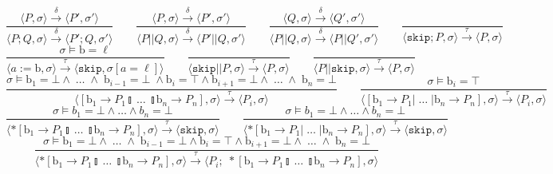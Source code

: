 \documentclass[times, 10pt]{article}
\begin{document}
$$
    \frac{\langle P, \sigma \rangle \xrightarrow{\delta} \langle P', \sigma' \rangle}{\langle P ; Q, \sigma \rangle \xrightarrow{\delta} \langle P' ; Q, \sigma' \rangle} \qquad
    \frac{\langle P, \sigma \rangle \xrightarrow{\delta} \langle P', \sigma' \rangle}{\langle P || Q, \sigma \rangle \xrightarrow{\delta} \langle P' || Q, \sigma' \rangle} \qquad
    \frac{\langle Q, \sigma \rangle \xrightarrow{\delta} \langle Q', \sigma' \rangle}{\langle P || Q, \sigma \rangle \xrightarrow{\delta} \langle P || Q', \sigma' \rangle} \qquad
    \frac{}{\langle \mathtt{skip}; P, \sigma \rangle \xrightarrow{\tau} \langle P, \sigma \rangle} $$$$
    \frac{\sigma \models \mathrm{b} = \ell}{\langle a := \mathrm{b}, \sigma \rangle \xrightarrow{\tau} \langle \mathtt{skip}, \sigma[a = \ell] \rangle} \qquad
    \frac{}{\langle \mathtt{skip} || P, \sigma \rangle \xrightarrow{\tau} \langle P, \sigma \rangle} \qquad
    \frac{}{\langle P || \mathtt{skip}, \sigma \rangle \xrightarrow{\tau} \langle P, \sigma \rangle} $$$$
    \frac{\sigma \models \mathrm{b}_1 = \bot \wedge \; \ldots \; \wedge \; \mathrm{b}_{i-1} = \bot \; \wedge \mathrm{b}_i = \top \wedge \mathrm{b}_{i+1} = \bot \wedge \; \ldots \; \wedge \; \mathrm{b}_n = \bot} {\langle [ \mathrm{b}_1 \rightarrow P_1  \talloblong \; \ldots \; \talloblong \mathrm{b}_n \rightarrow P_n ] , \sigma \rangle \xrightarrow{\tau} \langle P_i , \sigma\rangle  } \qquad
    \frac{\sigma \models \mathrm{b}_i = \top} {\langle [ \mathrm{b}_1 \rightarrow P_1  | \; \ldots \; | \mathrm{b}_n \rightarrow P_n ] , \sigma \rangle \xrightarrow{\tau} \langle P_i , \sigma\rangle  } $$$$
    \frac{\sigma \models b_1 = \bot \wedge \ldots \wedge b_n = \bot}{\langle *[ \mathrm{b}_1 \rightarrow P_1  \talloblong \; \ldots \; \talloblong \mathrm{b}_n \rightarrow P_n ] , \sigma \rangle \xrightarrow{\tau} \langle \mathtt{skip} , \sigma\rangle } \qquad
    \frac{\sigma \models b_1 = \bot \wedge \ldots \wedge b_n = \bot}{\langle *[ \mathrm{b}_1 \rightarrow P_1  | \; \ldots \; | \mathrm{b}_n \rightarrow P_n ] , \sigma \rangle \xrightarrow{\tau} \langle \mathtt{skip} , \sigma \rangle } $$$$
    \frac{\sigma \models \mathrm{b}_1 = \bot \wedge \; \ldots \; \wedge \; \mathrm{b}_{i-1} = \bot \wedge \mathrm{b}_i = \top \wedge \mathrm{b}_{i+1} = \bot \wedge \; \ldots \; \wedge \; \mathrm{b}_n = \bot} {\langle *[ \mathrm{b}_1 \rightarrow P_1  \talloblong \; \ldots \; \talloblong \mathrm{b}_n \rightarrow P_n ] , \sigma \rangle \xrightarrow{\tau} \langle P_i; \; *[ \mathrm{b}_1 \rightarrow P_1  \talloblong \; \ldots \; \talloblong \mathrm{b}_n \rightarrow P_n ] , \sigma\rangle  } $$$$
$$
\end{document}
